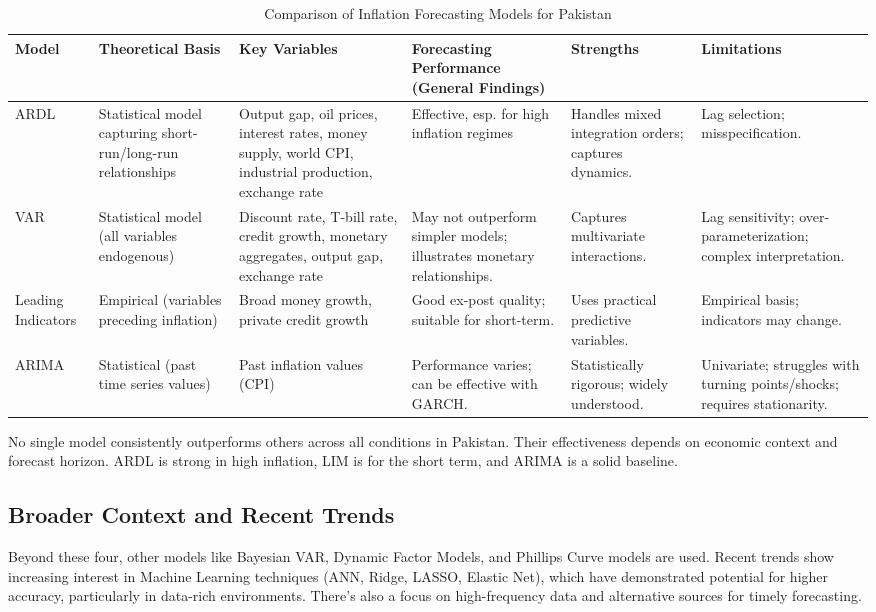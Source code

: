\documentclass[12pt,a4paper]{article}
\begin{document}
\begin{table}[h!]
\centering
\caption{Comparison of Inflation Forecasting Models for Pakistan}
\label{tab:comparison}
\footnotesize %
\begin{tabular}{|p{1.5cm}|p{2.5cm}|p{3cm}|p{3.5cm}|p{2.5cm}|p{2.5cm}|}
\hline
\textbf{Model} & \textbf{Theoretical Basis} & \textbf{Key Variables} & \textbf{Forecasting Performance (General Findings)} & \textbf{Strengths} & \textbf{Limitations} \\
\hline
ARDL & Statistical model capturing short-run/long-run relationships & Output gap, oil prices, interest rates, money supply, world CPI, industrial production, exchange rate & Effective, esp. for high inflation regimes & Handles mixed integration orders; captures dynamics. & Lag selection; misspecification. \\
\hline
VAR & Statistical model (all variables endogenous) & Discount rate, T-bill rate, credit growth, monetary aggregates, output gap, exchange rate & May not outperform simpler models; illustrates monetary relationships. & Captures multivariate interactions. & Lag sensitivity; over-parameterization; complex interpretation. \\
\hline
Leading Indicators & Empirical (variables preceding inflation) & Broad money growth, private credit growth & Good ex-post quality; suitable for short-term. & Uses practical predictive variables. & Empirical basis; indicators may change. \\
\hline
ARIMA & Statistical (past time series values) & Past inflation values (CPI) & Performance varies; can be effective with GARCH. & Statistically rigorous; widely understood. & Univariate; struggles with turning points/shocks; requires stationarity. \\
\hline
\end{tabular}
\end{table}

No single model consistently outperforms others across all conditions in Pakistan. Their effectiveness depends on economic context and forecast horizon. ARDL is strong in high inflation, LIM is for the short term, and ARIMA is a solid baseline.

\subsection{Broader Context and Recent Trends}
Beyond these four, other models like Bayesian VAR, Dynamic Factor Models, and Phillips Curve models are used. Recent trends show increasing interest in Machine Learning techniques (ANN, Ridge, LASSO, Elastic Net), which have demonstrated potential for higher accuracy, particularly in data-rich environments. There's also a focus on high-frequency data and alternative sources for timely forecasting.
\end{document}
